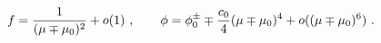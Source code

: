 \begin{equation}
f= {1\over  (\mu\mp\mu_0)^2}+o(1)\ ,\quad \quad \phi= \phi_0^\pm \mp
{c_0\over 4}(\mu\mp\mu_0)^4 + o((\mu\mp \mu_0)^6)\label{expanb}\ . 
\end{equation}

